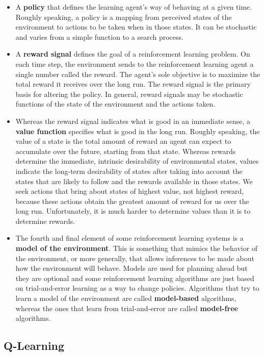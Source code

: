 \documentclass{article}
\begin{document}
\begin{itemize}
    \item A \textbf{policy} that defines the learning agent’s way of behaving at a given time. Roughly
    speaking, a policy is a mapping from perceived states of the environment to actions to be taken
    when in those states. It can be stochastic and varies from a simple function to a search process.
    \item A \textbf{reward signal} defines the goal of a reinforcement learning problem. On each time
    step, the environment sends to the reinforcement learning agent a single number called
    the reward. The agent’s sole objective is to maximize the total reward it receives over
    the long run. The reward signal is the primary basis for altering the policy. In general, reward
    signals may be stochastic functions of the state of the environment and the actions taken.
    \item Whereas the reward signal indicates what is good in an immediate sense, a \textbf{value
    function} specifies what is good in the long run. Roughly speaking, the value of a state is
    the total amount of reward an agent can expect to accumulate over the future, starting
    from that state. Whereas rewards determine the immediate, intrinsic desirability of
    environmental states, values indicate the long-term desirability of states after taking into
    account the states that are likely to follow and the rewards available in those states. We
    seek actions that bring about states of highest value, not highest reward, because these
    actions obtain the greatest amount of reward for us over the long run. Unfortunately, it
    is much harder to determine values than it is to determine rewards.
    \item The fourth and final element of some reinforcement learning systems is a \textbf{model of
    the environment}. This is something that mimics the behavior of the environment, or
    more generally, that allows inferences to be made about how the environment will behave. Models are
    used for planning ahead but they are optional and some reinforcement learning algorithms are just
    based on trial-and-error learning as a way to change policies. Algorithms that try to learn
    a model of the environment are called \textbf{model-based} algorithms, whereas the ones that
    learn from trial-and-error are called \textbf{model-free} algorithms.
\end{itemize}

\subsection{Q-Learning}
\end{document}

